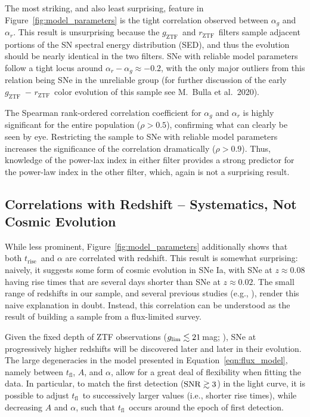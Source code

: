 \documentclass[twocolumn]{./aastex63}
\newcommand{\rztf}{$r_\mathrm{ZTF}$}
\newcommand{\gztf}{$g_\mathrm{ZTF}$}
\newcommand{\tfl}{$t_\mathrm{fl}$}
\newcommand{\trise}{$t_\mathrm{rise}$}
\begin{document}
The most striking, and also least surprising, feature in
Figure~\ref{fig:model_parameters} is the tight correlation observed between
$\alpha_g$ and $\alpha_r$. This result is unsurprising because the \gztf\
and \rztf\ filters sample adjacent portions of the SN spectral energy
distribution (SED), and thus the evolution should be nearly identical in the
two filters. SNe with reliable model parameters follow a tight locus around
$\alpha_r - \alpha_g \approx -0.2$, with the only major outliers from this
relation being SNe in the unreliable group (for further discussion of the
early \gztf\ $-$ \rztf\ color evolution of this sample see M.~Bulla et al.\
2020).

The Spearman rank-ordered correlation coefficient for $\alpha_g$
and $\alpha_r$ is highly significant for the entire population ($\rho >
0.5$), confirming what can clearly be seen by eye. Restricting the sample to
SNe with reliable model parameters increases the significance of the
correlation dramatically ($\rho > 0.9$). Thus, knowledge of the power-lax
index in either filter provides a strong predictor for the power-law index
in the other filter, which, again is not a surprising result.

\subsection{Correlations with Redshift -- Systematics, Not Cosmic Evolution}\label{sec:redshift_correlations}

While less prominent, Figure~\ref{fig:model_parameters} additionally shows
that both \trise\ and $\alpha$ are correlated with redshift. This result is
somewhat surprising: naively, it suggests some form of cosmic evolution in SNe
Ia, with SNe at $z \approx 0.08$ having rise times that are several days
shorter than SNe at $z \approx 0.02$. The small range of redshifts in our
sample, and several previous studies (e.g., \citealt{Conley06,Jones19}),
render this naive explanation in doubt. Instead, this correlation can be
understood as the result of building a sample from a flux-limited survey.

Given the fixed depth of ZTF observations ($g_\mathrm{lim} \lesssim 21$\,mag;
\citealt{Masci19,Bellm19}), SNe at progressively higher redshifts will be
discovered later and later in their evolution. The large degeneracies in the
model presented in Equation~\ref{eqn:flux_model}, namely between \tfl, $A$, and
$\alpha$, allow for a great deal of flexibility when fitting the data. In
particular, to match the first detection ($\mathrm{SNR} \gtrsim 3$) in the light
curve, it is possible to adjust \tfl\ to successively larger values (i.e.,
shorter rise times), while decreasing $A$ and $\alpha$, such that \tfl\ occurs
around the epoch of first detection.
\end{document}
